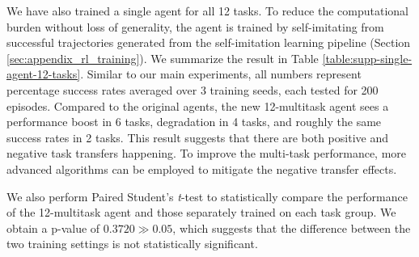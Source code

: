 
We have also trained a single agent for all 12 tasks. To reduce the computational burden without loss of generality, the agent is trained by self-imitating from successful trajectories generated from the self-imitation learning pipeline (Section \ref{sec:appendix_rl_training}). We summarize the result in Table \ref{table:supp-single-agent-12-tasks}. Similar to our main experiments, all numbers represent percentage success rates averaged over 3 training seeds, each tested for 200 episodes. 
Compared to the original agents, the new 12-multitask agent sees a performance boost in 6 tasks, degradation in 4 tasks, and roughly the same success rates in 2 tasks. This result suggests that there are both positive and negative task transfers happening. To improve the multi-task performance, more advanced algorithms \cite{yu2020gradient,wu2020understanding} can be employed to mitigate the negative transfer effects.

We also perform Paired Student’s \textit{t}-test to statistically compare the performance of the 12-multitask agent and those separately trained on each task group. We obtain a p-value of $0.3720 \gg 0.05$, which suggests that the difference between the two training settings is not statistically significant.




